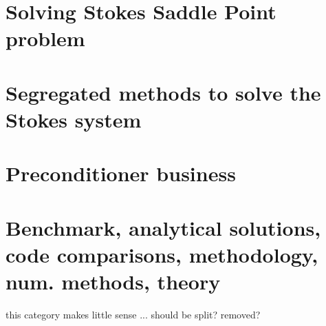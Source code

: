 \section{Solving Stokes Saddle Point problem}

\begin{scriptsize}
\end{scriptsize}

\section{Segregated methods to solve the Stokes system}

\begin{scriptsize}
\end{scriptsize}

\section{Preconditioner business}

\begin{scriptsize}
\end{scriptsize}

\section{Benchmark, analytical solutions, code comparisons, methodology, num. methods, theory}
{\color{red} this category makes little sense ... should be split? removed? }

